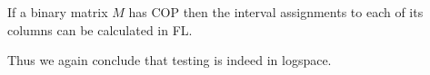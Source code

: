 \begin{corollary}
  \label{cor:coplog}
  If a binary matrix $M$ has COP then the interval assignments to each
  of its columns can be calculated in {\sc FL}.
\end{corollary}

Thus we again conclude that \COP testing is indeed in logspace.





